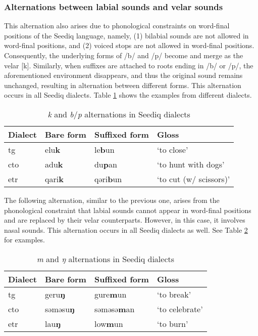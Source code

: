 \subsubsection{Alternations between labial sounds and velar sounds}

This alternation also arises due to phonological constraints on word-final positions of the Seediq language, namely, (1) bilabial sounds are not allowed in word-final positions, and (2) voiced stops are not allowed in word-final positions. Consequently, the underlying forms of /b/ and /p/ become and merge as the velar [k]. Similarly, when suffixes are attached to roots ending in /b/ or /p/, the aforementioned environment disappears, and thus the original sound remains unchanged, resulting in alternation between different forms. This alternation occurs in all Seediq dialects. Table \ref{tab:bpk_alt} shows the examples from different dialects. 

\begin{table}[!htbp]
\centering
\caption{\textit{k} and \textit{b}/\textit{p} alternations in Seediq dialects}
\label{tab:bpk_alt}
\begin{tabular}{llll}
\hline
Dialect   & Bare form & Suffixed form & Gloss                  \\ \hline
\acl{tg}  & elu\textbf{k}      & le\textbf{b}un         & `to close'             \\
\acl{cto} & adu\textbf{k}      & du\textbf{p}an         & `to hunt with dogs'   \\
\acl{etr} & qari\textbf{k}     & qəri\textbf{b}un       & `to cut (w/ scissors)' \\ \hline
\end{tabular}
\end{table}

The following alternation, similar to the previous one, arises from the phonological constraint that labial sounds cannot appear in word-final positions and are replaced by their velar counterparts. However, in this case, it involves nasal sounds. This alternation occurs in all Seediq dialects as well. See Table \ref{tab:mng_alt} for examples. 

\begin{table}[!htbp]
\centering
\caption{\textit{m} and \textit{ŋ} alternations in Seediq dialects}
\label{tab:mng_alt}
\begin{tabular}{llll}
\hline
Dialect   & Bare form & Suffixed form & Gloss          \\ \hline
\acl{tg}  & geru\textbf{ŋ}     & gure\textbf{m}un       & `to break'     \\
\acl{cto} & səməsu\textbf{ŋ}   & səməsə\textbf{m}an     & `to celebrate' \\
\acl{etr} & lau\textbf{ŋ}      & low\textbf{m}un        & `to burn'      \\ \hline
\end{tabular}
\end{table}

